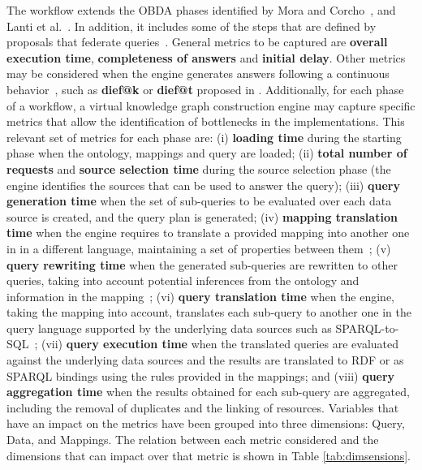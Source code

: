 The workflow extends the OBDA phases identified by Mora and Corcho~\citep{mora2013towards}, and Lanti et al.~\citep{lanti2015npd}. In addition, it includes some of the steps that are defined by proposals that federate queries~\citep{schwarte2011fedx}. General metrics to be captured are \textbf{overall execution time}, \textbf{completeness of answers} and \textbf{initial delay}. Other metrics may be considered when the engine generates answers following a continuous behavior~\citep{sharaf2008algorithms}, such as \textbf{dief@k} or \textbf{dief@t} proposed in \citep{acosta2017diefficiency}. Additionally, for each phase of a workflow, a virtual knowledge graph construction engine may capture specific metrics that allow the identification of bottlenecks in the implementations. This relevant set of metrics for each phase are: (i) \textbf{loading time} during the starting phase when the ontology, mappings and query are loaded; (ii) \textbf{total number of requests} and \textbf{source selection time} during the source selection phase (the engine identifies the sources that can be used to answer the query); (iii) \textbf{query generation time} when the set of sub-queries to be evaluated over each data source is created, and the query plan is generated; (iv) \textbf{mapping translation time} when the engine requires to translate a provided mapping into another one in in a different language, maintaining a set of properties between them~\citep{corcho2019towards}; (v) \textbf{query rewriting time} when the generated sub-queries are rewritten to other queries, taking into account potential inferences from the ontology and information in the mapping~\citep{mora2014kyrie2}; (vi) \textbf{query translation time} when the engine, taking the mapping into account, translates each sub-query to another one in the query language supported by the underlying data sources such as SPARQL-to-SQL~\citep{chebotko2009semantics}; (vii) \textbf{query execution time} when the translated queries are evaluated against the underlying data sources and the results are translated to RDF or as SPARQL bindings using the rules provided in the mappings; and (viii) \textbf{query aggregation time} when the results obtained for each sub-query are aggregated, including the removal of duplicates and the linking of resources. Variables that have an impact on the metrics have been grouped into three dimensions: Query, Data, and Mappings. The relation between each  metric considered  and the dimensions that can impact over that metric is  shown in Table \ref{tab:dimsensions}.

